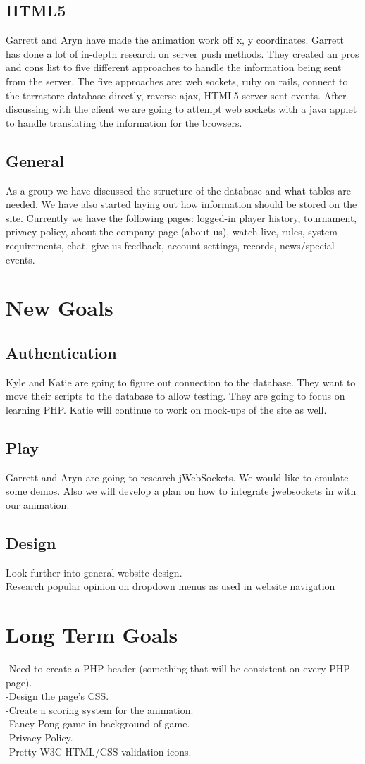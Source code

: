 	\subsection{HTML5}
	Garrett and Aryn have made the animation work off x, y coordinates. Garrett has done a lot of in-depth research on server push methods. They created an pros and cons list to five different approaches to handle the information being sent from the server. The five approaches are: web sockets, ruby on rails, connect to the terrastore database directly, reverse ajax, HTML5 server sent events. After discussing with the client we are going to attempt web sockets with a java applet to handle translating the information for the browsers.
	\subsection{General}
	As a group we have discussed the structure of the database and what tables are needed. We have also started laying out how information should be stored on the site. Currently we have the following pages: logged-in player history, tournament, privacy policy, about the company page (about us), watch live, rules, system requirements, chat, give us feedback, account settings, records, news/special events. 

\section{New Goals}
	\subsection{Authentication}
	Kyle and Katie are going to figure out connection to the database. They want to move their scripts to the database to allow testing. They are going to focus on learning PHP. Katie will continue to work on mock-ups of the site as well.
	\subsection{Play}
	Garrett and Aryn are going to research jWebSockets. We would like to emulate some demos. Also we will develop a plan on how to integrate jwebsockets in with our animation.
	\subsection{Design}
	Look further into general website design.\\Research popular opinion on dropdown menus as used in website navigation
	
\section{Long Term Goals}
	-Need to create a PHP header (something that will be consistent on every PHP page).\\
	-Design the page's CSS.\\
	-Create a scoring system for the animation.\\
	-Fancy Pong game in background of game.\\
	-Privacy Policy.\\
	-Pretty W3C HTML/CSS validation icons.\\




